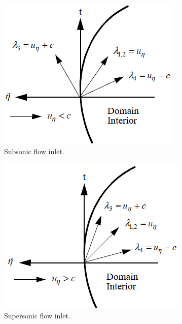%
\begin{figure}[H]
        \centering
        \begin{subfigure}[b]{0.495\textwidth}
                \centering
                \includegraphics[width=\textwidth]{figures/sub_inlet_bc.png}
                \caption{Subsonic flow inlet.}
                \label{fig:sub_flow_inlet}
        \end{subfigure}%
        \begin{subfigure}[b]{0.495\textwidth}
                \centering
                \includegraphics[width=\textwidth]{figures/sup_inlet_bc.png}
                \caption{Supersonic flow inlet.}
                \label{fig:sup_flow_inlet}
        \end{subfigure}
        \caption{\label{fig:inlet_sct3}}
\end{figure}
